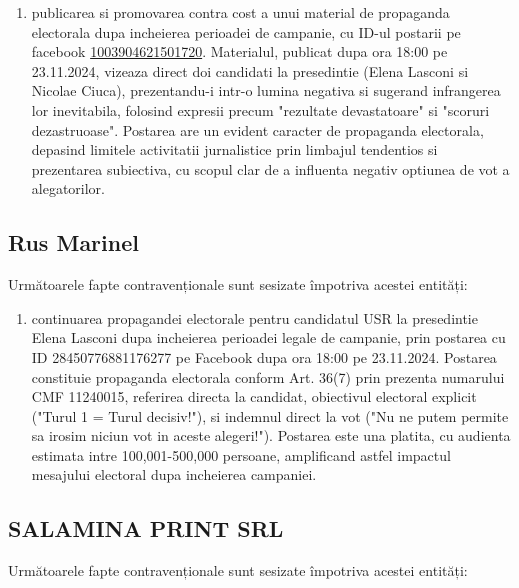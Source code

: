 \documentclass[a4paper,12pt]{article}
\begin{document}
\begin{enumerate}[leftmargin=*, label=\arabic*.)]
    \item publicarea si promovarea contra cost a unui material de propaganda electorala dupa incheierea perioadei de campanie, cu ID-ul postarii pe facebook \href{https://www.facebook.com/ads/library/?id=1003904621501720}{1003904621501720}. Materialul, publicat dupa ora 18:00 pe 23.11.2024, vizeaza direct doi candidati la presedintie (Elena Lasconi si Nicolae Ciuca), prezentandu-i intr-o lumina negativa si sugerand infrangerea lor inevitabila, folosind expresii precum "rezultate devastatoare" si "scoruri dezastruoase". Postarea are un evident caracter de propaganda electorala, depasind limitele activitatii jurnalistice prin limbajul tendentios si prezentarea subiectiva, cu scopul clar de a influenta negativ optiunea de vot a alegatorilor.
\end{enumerate}

\vspace{0.5cm}

\subsection{Rus Marinel}
Următoarele fapte contravenționale sunt sesizate împotriva acestei entități:

\begin{enumerate}[leftmargin=*, label=\arabic*.)]
    \item continuarea propagandei electorale pentru candidatul USR la presedintie Elena Lasconi dupa incheierea perioadei legale de campanie, prin postarea cu ID 28450776881176277 pe Facebook dupa ora 18:00 pe 23.11.2024. Postarea constituie propaganda electorala conform Art. 36(7) prin prezenta numarului CMF 11240015, referirea directa la candidat, obiectivul electoral explicit ("Turul 1 = Turul decisiv!"), si indemnul direct la vot ("Nu ne putem permite sa irosim niciun vot in aceste alegeri!"). Postarea este una platita, cu audienta estimata intre 100,001-500,000 persoane, amplificand astfel impactul mesajului electoral dupa incheierea campaniei.
\end{enumerate}

\vspace{0.5cm}

\subsection{SALAMINA PRINT SRL}
Următoarele fapte contravenționale sunt sesizate împotriva acestei entități:
\end{document}
